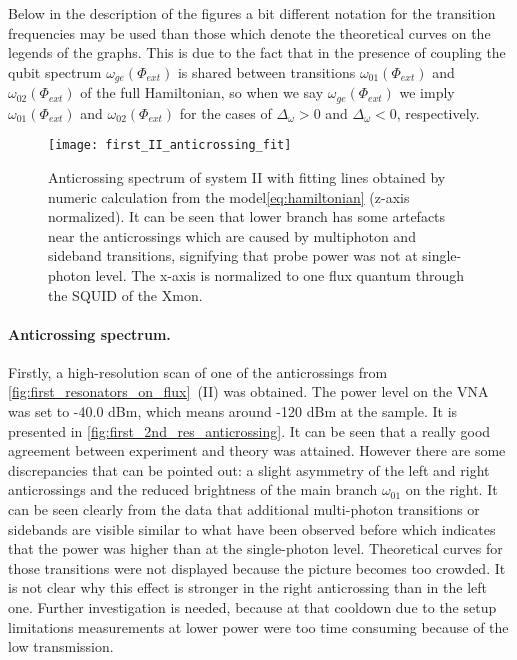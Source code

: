 Below in the description of the figures a bit different notation for the transition frequencies may be used than those which denote the theoretical curves on the legends of the graphs. This is due to the fact that in the presence of coupling the qubit spectrum $\omega_{ge}(\Phi_{ext})$ is shared between transitions $\omega_{01}(\Phi_{ext})$ and $\omega_{02}(\Phi_{ext})$ of the full Hamiltonian, so when we say $\omega_{ge}(\Phi_{ext})$ we imply $\omega_{01}(\Phi_{ext})$ and $\omega_{02}(\Phi_{ext})$ for the cases of $\Delta_\omega > 0 $ and $\Delta_\omega < 0$, respectively.

\begin{figure}
\centering
\texttt{[image: first\_II\_anticrossing\_fit]}
\caption{Anticrossing spectrum of system II with fitting lines obtained by numeric calculation from the model\eqref{eq:hamiltonian} (z-axis normalized). It can be seen that lower branch has some artefacts near the anticrossings which are caused by multiphoton and sideband transitions, signifying that probe power was not at single-photon level. The x-axis is normalized to one flux quantum through the SQUID of the Xmon.}
\label{fig:first_2nd_res_anticrossing}
\end{figure} 

\paragraph{Anticrossing spectrum.} Firstly, a high-resolution scan of one of the anticrossings from \autoref{fig:first_resonators_on_flux}~(II) was obtained. The power level on the VNA was set to -40.0 dBm, which means around -120 dBm at the sample. It is presented in \autoref{fig:first_2nd_res_anticrossing}. It can be seen that a really good agreement between experiment and theory was attained. However there are some discrepancies that can be pointed out: a slight asymmetry of the left and right anticrossings and the reduced brightness of the main branch $\omega_{01}$ on the right. It can be seen clearly from the data that additional multi-photon transitions or sidebands are visible similar to what have been observed before\cite{bishop2009} which indicates that the power was higher than at the single-photon level. Theoretical curves for those transitions were not displayed because the picture becomes too crowded. It is not clear why this effect is stronger in the right anticrossing than in the left one. Further investigation is needed, because at that cooldown due to the setup limitations measurements at lower power were too time consuming because of the low transmission.

